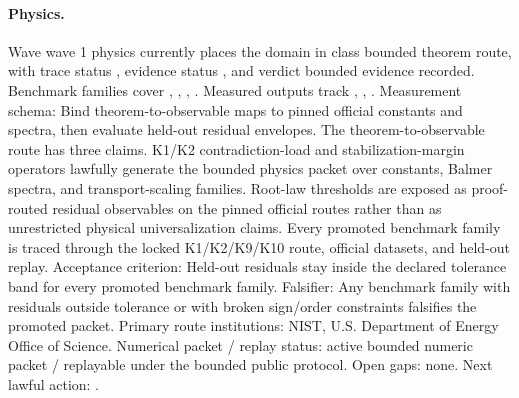 \paragraph{Physics.}
Wave wave 1 physics currently places the domain in class bounded theorem route, with trace status , evidence status , and verdict bounded evidence recorded.
Benchmark families cover , \allowbreak {}, \allowbreak {}, \allowbreak {}.
Measured outputs track , \allowbreak {}, \allowbreak {}.
Measurement schema: Bind theorem-to-observable maps to pinned official constants and spectra, then evaluate held-out residual envelopes.
The theorem-to-observable route has three claims. K1/K2 contradiction-load and stabilization-margin operators lawfully generate the bounded physics packet over constants, Balmer spectra, and transport-scaling families. Root-law thresholds are exposed as proof-routed residual observables on the pinned official routes rather than as unrestricted physical universalization claims. Every promoted benchmark family is traced through the locked K1/K2/K9/K10 route, official datasets, and held-out replay.
Acceptance criterion: Held-out residuals stay inside the declared tolerance band for every promoted benchmark family.
Falsifier: Any benchmark family with residuals outside tolerance or with broken sign/order constraints falsifies the promoted packet.
Primary route institutions: NIST, \allowbreak U.S. Department of Energy Office of Science.
Numerical packet / replay status: active bounded numeric packet / replayable under the bounded public protocol.
Open gaps: none.
Next lawful action: .

